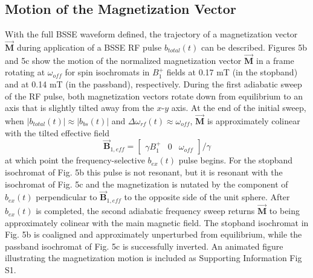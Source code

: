 \documentclass[a4paper,12pt]{article}
\newcommand{\bfullt}{b_{total}(t)}
\newcommand{\bext}{b_{ex}(t)}
\newcommand{\bbst}{b_{bs}(t)}
\begin{document}
\subsection*{Motion of the Magnetization Vector}
With the full BSSE waveform defined, 
the trajectory of a magnetization vector $\overrightarrow{\textbf{M}}$ 
during application of a BSSE RF pulse $\bfullt$ can be described. 
Figures 5b and 5c show the motion of the normalized magnetization vector $\overrightarrow{\textbf{M}}$ in a frame rotating at $\omega_{off}$ for spin isochromats in $B_1^+$ fields at 0.17 mT (in the stopband) and at 0.14 mT (in the passband), respectively. 
During the first adiabatic sweep of the RF pulse, both magnetization vectors rotate down from equilibrium
to an axis that is slightly tilted away from the $x$-$y$ axis.
At the end of the initial sweep, when $|\bfullt| \approx |\bbst|$ and $\Delta \omega_{rf}(t) \approx \omega_{off}$, 
$\overrightarrow{\textbf{M}}$ is approximately colinear with the tilted effective field
\begin{equation*}
    \overrightarrow{\textbf{B}}_{1,eff} = \left[\begin{array}{ccc} \gamma B_1^+ & 0 & \omega_{off}\end{array}\right]/\gamma
\end{equation*}
at which point the frequency-selective $\bext$ pulse begins. 
For the stopband isochromat of Fig. 5b this pulse is not resonant, 
but it is resonant with the isochromat of Fig. 5c 
and the magnetization is nutated by the component of $\bext$ perpendicular to $\overrightarrow{\textbf{B}}_{1,eff}$ 
to the opposite side of the unit sphere.
After $\bext$ is completed, the second adiabatic frequency sweep returns $\overrightarrow{\textbf{M}}$ to being approximately colinear with the main magnetic field. 
The stopband isochromat in Fig. 5b is coaligned and approximately unperturbed from equilibrium, 
while the passband isochromat of Fig. 5c  is successfully inverted.
An animated figure illustrating the magnetization motion is included as Supporting Information Fig S1.
\end{document}
